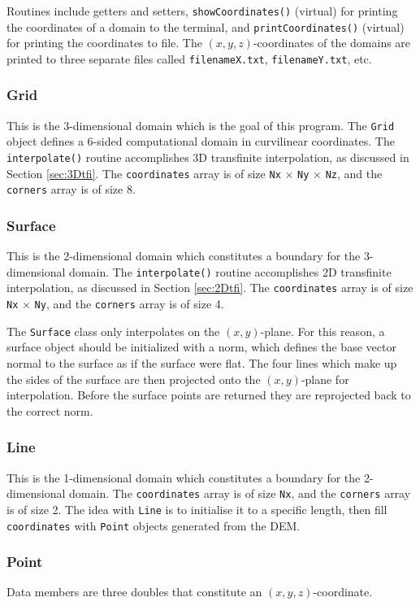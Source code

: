 \documentclass{article}
\renewcommand{\t}[1]{\texttt{#1}}
\begin{document}
Routines include getters and setters, \t{showCoordinates()} (virtual) for printing the coordinates of a domain to the terminal, and \t{printCoordinates()} (virtual) for printing the coordinates to file. The $(x,y,z)$-coordinates of the domains are printed to three separate files called \t{filenameX.txt}, \t{filenameY.txt}, etc.

\subsubsection{Grid}
This is the 3-dimensional domain which is the goal of this program.  The \t{Grid} object defines a 6-sided computational domain in curvilinear coordinates. The \t{interpolate()} routine accomplishes 3D transfinite interpolation, as discussed in Section \ref{sec:3Dtfi}. The \t{coordinates} array is of size \t{Nx} $\times$ \t{Ny} $\times$ \t{Nz}, and the \t{corners} array is of size 8.

\subsubsection{Surface}
This is the 2-dimensional domain which constitutes a boundary for the 3-dimensional domain. The \t{interpolate()} routine accomplishes 2D transfinite interpolation, as discussed in Section \ref{sec:2Dtfi}. The \t{coordinates} array is of size \t{Nx} $\times$ \t{Ny}, and the \t{corners} array is of size 4.

The \texttt{Surface} class only interpolates on the $(x,y)$-plane. For this reason, a surface object should be initialized with a norm, which defines the base vector normal to the surface as if the surface were flat. The four lines which make up the sides of the surface are then projected onto the $(x,y)$-plane for interpolation. Before the surface points are returned they are reprojected back to the correct norm.

\subsubsection{Line}
This is the 1-dimensional domain which constitutes a boundary for the 2-dimensional domain. The \t{coordinates} array is of size \t{Nx}, and the \t{corners} array is of size 2. The idea with \t{Line} is to initialise it to a specific length, then fill \t{coordinates} with \t{Point} objects generated from the DEM. 

\subsubsection{Point}
Data members are three doubles that constitute an $(x,y,z)$-coordinate. 
\end{document}
